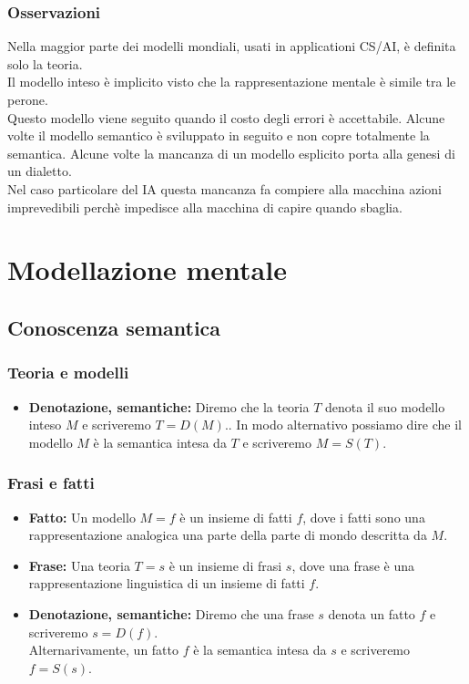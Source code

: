\documentclass{book}
\newcommand{\spazio}{\vspace{1em} \newline}
\begin{document}
        \subsection{Osservazioni}
        Nella maggior parte dei modelli mondiali, usati in applicationi CS/AI, è definita solo la teoria.\\
        Il modello inteso è implicito visto che la rappresentazione mentale è simile tra le perone.\\
        Questo modello viene seguito quando il costo degli errori è accettabile.
        \spazio
        Alcune volte il modello semantico è sviluppato in seguito e non copre totalmente la semantica.
        \spazio
        Alcune volte la mancanza di un modello esplicito porta alla genesi di un dialetto.\\
        Nel caso particolare del IA questa mancanza fa compiere alla macchina azioni imprevedibili perchè impedisce alla macchina di capire quando sbaglia.

    \chapter{Modellazione mentale}
    \section{Conoscenza semantica}
    \subsection{Teoria e modelli}
    \begin{itemize}
        \item \textbf{Denotazione, semantiche:} Diremo che la teoria $T$ denota il suo modello inteso $M$ e scriveremo $T=D(M)$..
            In modo alternativo possiamo dire che il modello $M$ è la semantica intesa da $T$ e scriveremo $M=S(T)$.
    \end{itemize}

    \subsection{Frasi e fatti}
    \begin{itemize}
        \item \textbf{Fatto:} Un modello $M={f}$ è un insieme di fatti $f$, dove i fatti sono una rappresentazione analogica una parte della parte di mondo descritta da $M$.
        \item \textbf{Frase:} Una teoria $T={s}$ è un insieme di frasi $s$, dove una frase è una rappresentazione linguistica di un insieme di fatti $f$.
        \item \textbf{Denotazione, semantiche:} Diremo che una frase $s$ denota un fatto $f$ e scriveremo $s=D(f)$.\\
            Alternarivamente, un fatto $f$ è la semantica intesa da $s$ e scriveremo $f=S(s)$.
    \end{itemize}
\end{document}
